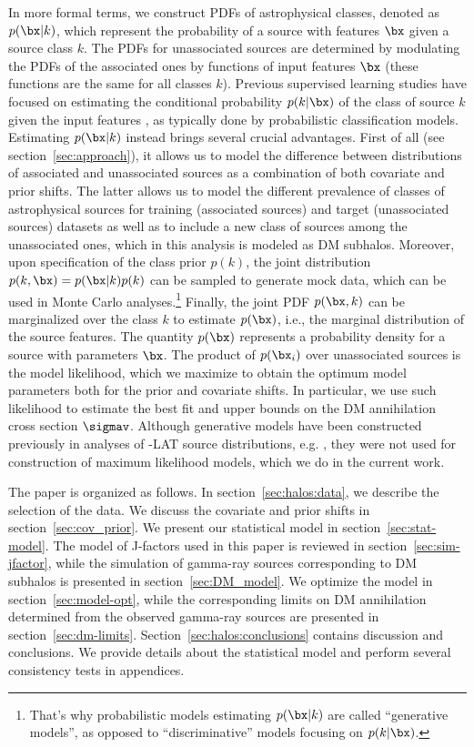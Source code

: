 In more formal terms, 
we construct PDFs of astrophysical classes, denoted as $p(\bx|k)$,
which represent the probability of a source with features $\bx$ given a source class $k$. 
The PDFs for unassociated sources are determined by modulating the PDFs of the associated ones by functions of input features $\bx$ (these functions are the same for all classes $k$).
Previous supervised learning studies have focused on estimating the conditional probability $p(k|\bx)$ of the class of source $k$ given the input features 
\FermiMLclassif, as typically done by probabilistic classification models.
Estimating $p(\bx|k)$ instead brings several crucial advantages. First of all (see section~\ref{sec:approach}), it allows us to model the difference between distributions of associated and unassociated sources as a combination of both covariate and prior shifts.
The latter allows us to model the different prevalence of classes of astrophysical sources for training (associated sources) and target (unassociated sources) datasets as well as to include a new class of sources among the unassociated ones, which in this analysis is modeled as DM subhalos.
Moreover, upon specification of the class prior $p(k)$, the joint distribution $p(k,\bx)=p(\bx|k)p(k)$ can be sampled to generate mock data, which can be used in Monte Carlo analyses.\footnote{That's why probabilistic models estimating $p(\bx|k)$ are called ``generative models'', as opposed to ``discriminative'' models focusing on $p(k|\bx)$.} Finally, the joint PDF  $p(\bx, k)$ can be marginalized over the class $k$ to estimate $p(\bx)$, i.e., the marginal distribution of the source features. 
The quantity $p(\bx)$
represents a probability density for a source with parameters $\bx$. 
The product of $p(\bx_i)$ over unassociated sources is the model likelihood, which we maximize to obtain the optimum model parameters both for the prior and covariate shifts.
In particular, we use such likelihood to estimate the best fit and upper bounds on the DM annihilation cross section $\sigmav$.
Although generative models have been constructed previously in analyses of \Fermi-LAT source distributions, e.g. \cite{2023MNRAS.520.1348G}, they were not used for construction of maximum likelihood models, which we do in the current work.

The paper is organized as follows.
In section~\ref{sec:halos:data},
we describe the selection of the data.
We discuss the covariate and prior shifts in section~\ref{sec:cov_prior}. We present our statistical model in section~\ref{sec:stat-model}. 
The model of J-factors used in this paper is reviewed in section~\ref{sec:sim-jfactor}, while the simulation of gamma-ray sources corresponding to DM subhalos is presented in section~\ref{sec:DM_model}. 
We optimize the model in section~\ref{sec:model-opt}, while
the corresponding limits on DM annihilation determined from the observed gamma-ray sources are presented in section~\ref{sec:dm-limits}.
Section~\ref{sec:halos:conclusions} contains discussion and conclusions. 
We provide details about the statistical model and
perform several  consistency tests in appendices.

